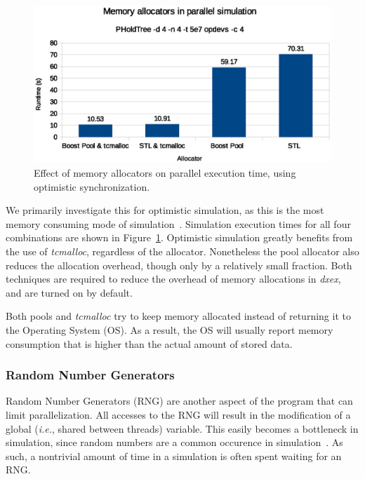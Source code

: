 \begin{figure}
    \center
    \includegraphics[width=\columnwidth]{fig/memory_allocators_parallel.eps}
    \caption{Effect of memory allocators on parallel execution time, using optimistic synchronization.}
    \label{fig:memallocators_parallel}
\end{figure}

We primarily investigate this for optimistic simulation, as this is the most memory consuming mode of simulation~\cite{FujimotoBook}.
Simulation execution times for all four combinations are shown in Figure~\ref{fig:memallocators_parallel}.
Optimistic simulation greatly benefits from the use of \textit{tcmalloc}, regardless of the allocator.
Nonetheless the pool allocator also reduces the allocation overhead, though only by a relatively small fraction.
Both techniques are required to reduce the overhead of memory allocations in \textit{dxex}, and are turned on by default.

Both pools and \textit{tcmalloc} try to keep memory allocated instead of returning it to the Operating System (OS).
As a result, the OS will usually report memory consumption that is higher than the actual amount of stored data.

\subsubsection{Random Number Generators}
Random Number Generators (RNG) are another aspect of the program that can limit parallelization.
All accesses to the RNG will result in the modification of a global (\textit{i.e.}, shared between threads) variable.
This easily becomes a bottleneck in simulation, since random numbers are a common occurence in simulation~\cite{Random}.
As such, a nontrivial amount of time in a simulation is often spent waiting for an RNG.

